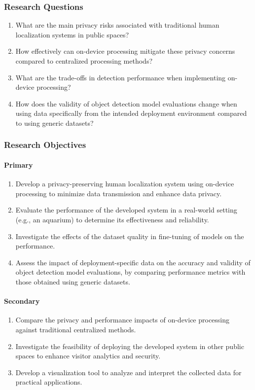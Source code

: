 \subsubsection{Research Questions}
\label{sec:research_questions}
\begin{enumerate}
	\item What are the main privacy risks associated with traditional human localization systems in public spaces?
	\item How effectively can on-device processing mitigate these privacy concerns compared to centralized processing methods?
	\item What are the trade-offs in detection performance when implementing on-device processing?
	\item How does the validity of object detection model evaluations change when using data specifically from the intended deployment environment compared to using generic datasets?
\end{enumerate}

\subsubsection{Research Objectives}

\paragraph{Primary}
\begin{enumerate}
	\item Develop a privacy-preserving human localization system using on-device processing to minimize data transmission and enhance data privacy.
	\item Evaluate the performance of the developed system in a real-world setting (e.g., an aquarium) to determine its effectiveness and reliability.
	\item Investigate the effects of the dataset quality in fine-tuning of models on the performance.
	\item Assess the impact of deployment-specific data on the accuracy and validity of object detection model evaluations, by comparing performance metrics with those obtained using generic datasets.
\end{enumerate}

\paragraph{Secondary}
\begin{enumerate}
	\item Compare the privacy and performance impacts of on-device processing against traditional centralized methods. 
	\item Investigate the feasibility of deploying the developed system in other public spaces to enhance visitor analytics and security.
	\item Develop a visualization tool to analyze and interpret the collected data for practical applications.
\end{enumerate}

